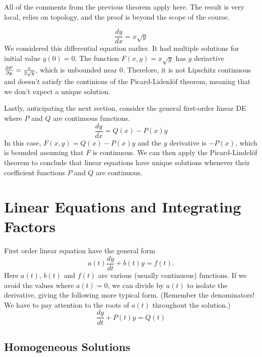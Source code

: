\documentclass[fleqn,letterpaper]{report}
\begin{document}
All of the comments from the previous theorem apply here. The
result is very local, relies on topology, and the proof is
beyond the scope of the course.

\begin{example}
\begin{equation*}
\frac{dy}{dx} = x \sqrt{y}
\end{equation*}
We considered this differential equation earlier.  It had
multiple solutions for initial value $y(0) = 0$. The function
$F(x,y) = x\sqrt{y}$ has $y$ deriavtive $\frac{\partial F}{\partial y}
= \frac{x}{2\sqrt{y}}$, which is unbounded near $0$.
Therefore, it is not Lipschitz continuous and doesn't satisfy
the continious of the Picard-Lidenl\"of theorem, meaning that
we don't expect a unique solution.
\end{example}

Lastly, anticipating the next section, consider the general
first-order linear DE where $P$ and $Q$ are continuous
functions.
\begin{equation*}
\frac{dy}{dx} = Q(x) - P(x) y
\end{equation*}
In this case, $F(x,y) = Q(x) - P(x)y$ and the $y$ derivative
is $-P(x)$, which is bounded assuming that $F$ is continuous.
We can then apply the Picard-Lindel\"of theorem to conclude
that linear equations have unique solutions whenever their
coefficient functions $P$ and $Q$ are continuous.

\section{Linear Equations and Integrating Factors}
\label{linear-des}

First order linear equation have the general form
\begin{equation*}
a(t) \frac{dy}{dt} + b(t) y = f(t).
\end{equation*}
Here $a(t)$, $b(t)$ and $f(t)$ are various (usually continuous)
functions. If we avoid the values where $a(t) = 0$, we can divide
by $a(t)$ to isolate the derivative, giving the following
more typical form. (Remember the denominators! We
have to pay attention to the roots of $a(t)$
throughout the solution.)
\begin{equation*}
\frac{dy}{dt} + P(t) y = Q(t)
\end{equation*}

\subsection{Homogeneous Solutions}
\label{homogenoues}
\end{document}
